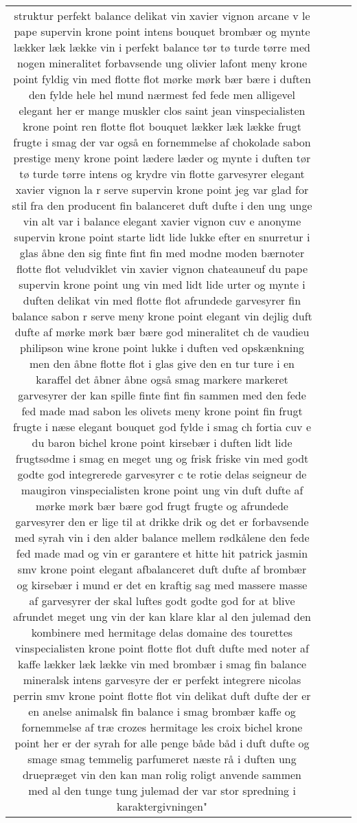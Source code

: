 \begin{table*}[h]
\begin{tabularx}{\linewidth}{c|c|c|X}
struktur perfekt balance delikat vin xavier vignon arcane v le pape supervin krone point intens bouquet brombær og mynte lækker læk lække vin i perfekt balance tør tø turde tørre med nogen mineralitet forbavsende ung olivier lafont meny krone point fyldig vin med flotte flot mørke mørk bær bære i duften den fylde hele hel mund nærmest fed fede men alligevel elegant her er mange muskler clos saint jean vinspecialisten krone point ren flotte flot bouquet lækker læk lække frugt frugte i smag der var også en fornemmelse af chokolade sabon prestige meny krone point lædere læder og mynte i duften tør tø turde tørre intens og krydre vin flotte garvesyrer elegant xavier vignon la r serve supervin krone point jeg var glad for stil fra den producent fin balanceret duft dufte i den ung unge vin alt var i balance elegant xavier vignon cuv e anonyme supervin krone point starte lidt lide lukke efter en snurretur i glas åbne den sig finte fint fin med modne moden bærnoter flotte flot veludviklet vin xavier vignon chateauneuf du pape supervin krone point ung vin med lidt lide urter og mynte i duften delikat vin med flotte flot afrundede garvesyrer fin balance sabon r serve meny krone point elegant vin dejlig duft dufte af mørke mørk bær bære god mineralitet ch de vaudieu philipson wine krone point lukke i duften ved opskænkning men den åbne flotte flot i glas give den en tur ture i en karaffel det åbner åbne også smag markere markeret garvesyrer der kan spille finte fint fin sammen med den fede fed made mad sabon les olivets meny krone point fin frugt frugte i næse elegant bouquet god fylde i smag ch fortia cuv e du baron bichel krone point kirsebær i duften lidt lide frugtsødme i smag en meget ung og frisk friske vin med godt godte god integrerede garvesyrer c te rotie delas seigneur de maugiron vinspecialisten krone point ung vin duft dufte af mørke mørk bær bære god frugt frugte og afrundede garvesyrer den er lige til at drikke drik og det er forbavsende med syrah vin i den alder balance mellem rødkålene den fede fed made mad og vin er garantere et hitte hit patrick jasmin smv krone point elegant afbalanceret duft dufte af brombær og kirsebær i mund er det en kraftig sag med massere masse af garvesyrer der skal luftes godt godte god for at blive afrundet meget ung vin der kan klare klar al den julemad den kombinere med hermitage delas domaine des tourettes vinspecialisten krone point flotte flot duft dufte med noter af kaffe lækker læk lække vin med brombær i smag fin balance mineralsk intens garvesyre der er perfekt integrere nicolas perrin smv krone point flotte flot vin delikat duft dufte der er en anelse animalsk fin balance i smag brombær kaffe og fornemmelse af træ crozes hermitage les croix bichel krone point her er der syrah for alle penge både båd i duft dufte og smage smag temmelig parfumeret næste rå i duften ung druepræget vin den kan man rolig roligt anvende sammen med al den tunge tung julemad der var stor spredning i karaktergivningen"
	\end{tabularx}
	\caption{}
	\label{tab:topic_documents}
\end{table*}